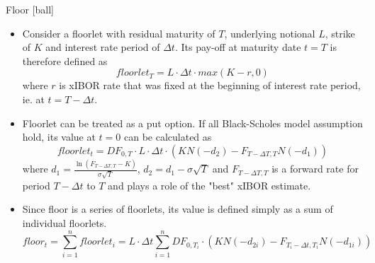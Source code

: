 \documentclass{beamer}
\begin{document}
\begin{frame}{Floor}
[ball]
\begin{itemize}
\item Consider a floorlet with residual maturity of $T$, underlying notional $L$, strike of $K$ and interest rate period of $\Delta t$. Its pay-off at maturity date $t = T$ is therefore defined as
\begin{equation}
floorlet_T = L \cdot \Delta t \cdot max(K - r, 0)
\end{equation}
where $r$ is xIBOR rate that was fixed at the beginning of interest rate period, ie. at $t = T - \Delta t$.
\item Floorlet can be treated as a put option. If all Black-Scholes model assumption hold, its value at $t = 0$ can be calculated as
\begin{equation}
floorlet_t = DF_{0, T} \cdot L \cdot \Delta t \cdot \left(KN(-d_2) - F_{T - \Delta T, T} N(-d_1) \right)
\end{equation}
where $d_1 = \frac{\ln(F_{T - \Delta T, T} - K)}{\sigma \sqrt{T}}$, $d_2 = d_1 - \sigma \sqrt{T}$ and $F_{T - \Delta T, T}$ is a forward rate for period $T - \Delta t$ to $T$ and plays a role of the "best" xIBOR estimate.
\item Since floor is a series of floorlets, its value is defined simply as a sum of individual floorlets.
\begin{equation}
floor_t = \sum_{i = 1}^n floorlet_i = L \cdot \Delta t \sum_{i = 1}^n DF_{0, T_i} \cdot \left(KN(-d_{2i}) - F_{T_i - \Delta t, T_i} N(-d_{1i}) \right)
\end{equation}
\end{itemize}
\end{frame}
\end{document}
